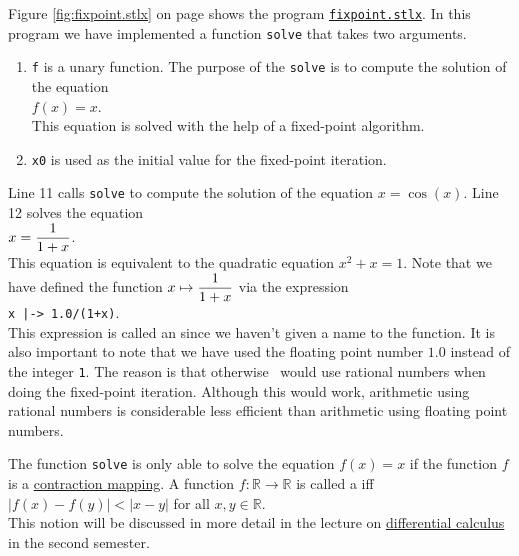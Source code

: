 Figure \ref{fig:fixpoint.stlx} on page \pageref{fig:fixpoint.stlx} shows the program
\href{https://github.com/karlstroetmann/Logik/blob/master/SetlX/fixpoint.stlx}{\texttt{fixpoint.stlx}}.
In this program we have implemented a function \texttt{solve} that takes two arguments.
\begin{enumerate}
\item \texttt{f} is a unary function.  The purpose of the \texttt{solve} is to compute the solution of the equation
      \\[0.2cm]
      \hspace*{1.3cm}
      $f(x) = x$.
      \\[0.2cm]
      This equation is solved with the help of a fixed-point algorithm.
\item \texttt{x0} is used as the initial value for the fixed-point iteration.
\end{enumerate}
Line 11 calls \texttt{solve} to compute the solution of the equation $x = \cos(x)$.
Line 12 solves the equation 
\\[0.2cm]
\hspace*{1.3cm}
$\displaystyle x = \frac{\displaystyle1}{\displaystyle 1+x}$. 
\\[0.2cm]
This equation is equivalent to the quadratic equation $x^2 + x = 1$.  Note that we have defined the function
 $\displaystyle x \mapsto \frac{1}{1+x}$ via the expression
 \\[0.2cm]
\hspace*{1.3cm}
\texttt{x |-> 1.0/(1+x)}.
\\[0.2cm]
This expression is called an  since we haven't given a name to the function.  It is
also important to note that we have used the floating point number  $1.0$ instead of the integer \texttt{1}.
The reason is that otherwise \setlx\ would use rational numbers when doing the fixed-point iteration.  Although this would
work, arithmetic using rational numbers is considerable less efficient than arithmetic using floating point
numbers. 

\remarkEng
The function \texttt{solve} is only able to solve the equation $f(x) = x$ if the function $f$ is a 
\href{https://en.wikipedia.org/wiki/Contraction_mapping}{contraction mapping}.  A function 
$f:\mathbb{R} \rightarrow \mathbb{R}$
is called a  iff 
\\[0.2cm]
\hspace*{1.3cm}
$|f(x) - f(y)| < |x - y|$ \quad for all $x,y \in \mathbb{R}$.
\\[0.2cm]
This notion will be discussed in more detail in the lecture on 
\href{https://github.com/karlstroetmann/Analysis/blob/master/Script/analysis.pdf}{differential
  calculus} in the second semester. \eox 

